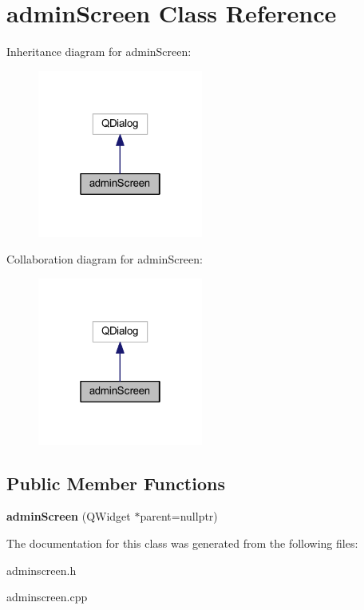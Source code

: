 \hypertarget{classadmin_screen}{}\section{admin\+Screen Class Reference}
\label{classadmin_screen}


Inheritance diagram for admin\+Screen\+:\nopagebreak
\begin{figure}[H]
\begin{center}
\leavevmode
\includegraphics[width=154pt]{classadmin_screen__inherit__graph}
\end{center}
\end{figure}


Collaboration diagram for admin\+Screen\+:\nopagebreak
\begin{figure}[H]
\begin{center}
\leavevmode
\includegraphics[width=154pt]{classadmin_screen__coll__graph}
\end{center}
\end{figure}
\subsection*{Public Member Functions}
\begin{DoxyCompactItemize}
\item 
\mbox{\label{classadmin_screen_ae4f80dfbf6d56b9b0318cd44d95baf8c}} 
{\bfseries admin\+Screen} (Q\+Widget $\ast$parent=nullptr)
\end{DoxyCompactItemize}


The documentation for this class was generated from the following files\+:\begin{DoxyCompactItemize}
\item 
adminscreen.\+h\item 
adminscreen.\+cpp\end{DoxyCompactItemize}
